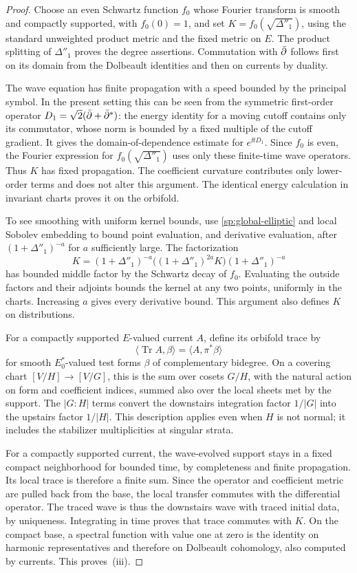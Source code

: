 \begin{proof}
Choose an even Schwartz function $f_0$ whose Fourier transform is smooth
and compactly supported, with $f_0(0)=1$, and set
$K=f_0(\sqrt{\Delta''_1})$, using the standard unweighted product
metric and the fixed metric on $E$.  The product splitting of
$\Delta''_1$ proves the degree assertions.  Commutation with $\bar\partial$
follows first on its domain from the Dolbeault identities and then on
currents by duality.

The wave equation has finite propagation with a speed bounded by the
principal symbol.  In the present setting this can be seen from the
symmetric first-order operator $D_1=\sqrt2(\bar\partial+\bar\partial^*)$:
the energy identity for a moving cutoff contains only its commutator,
whose norm is bounded by a fixed multiple of the cutoff gradient.
It gives the domain-of-dependence estimate for $e^{\ii tD_1}$.
Since $f_0$ is even, the Fourier expression for
$f_0(\sqrt{\Delta''_1})$ uses only these finite-time wave operators.
Thus $K$ has fixed propagation.  The coefficient curvature contributes
only lower-order terms and does not alter this argument.  The identical
energy calculation in invariant charts proves it on the orbifold.

To see smoothing with uniform kernel bounds, use
\eqref{sp:global-elliptic} and local Sobolev embedding to bound point
evaluation, and derivative evaluation, after $(1+\Delta''_1)^{-a}$
for $a$ sufficiently large.  The factorization
\[
 K=(1+\Delta''_1)^{-a}
 \bigl((1+\Delta''_1)^{2a}K\bigr)
 (1+\Delta''_1)^{-a}
\]
has bounded middle factor by the Schwartz decay of $f_0$.  Evaluating
the outside factors and their adjoints bounds the kernel at any two
points, uniformly in the charts.  Increasing $a$ gives every derivative
bound.  This argument also defines $K$ on distributions.

For a compactly supported $E$-valued current $A$, define its orbifold
trace by
\[
 \langle\operatorname{Tr}A,\beta\rangle
 =\langle A,\pi^*\beta\rangle
\]
for smooth $E_0^*$-valued test forms $\beta$ of complementary bidegree.
On a covering chart $[V/H]\to[V/G]$, this is the sum over cosets
$G/H$, with the natural action on form and coefficient indices, summed
also over the local sheets met by the support.  The $|G:H|$ terms
convert the downstairs integration factor $1/|G|$ into the upstairs
factor $1/|H|$.  This description applies even when $H$ is not normal;
it includes the stabilizer multiplicities at singular strata.

For a compactly supported current, the wave-evolved support stays in a
fixed compact neighborhood for bounded time, by completeness and finite
propagation.  Its local trace is therefore a finite sum.  Since the
operator and coefficient metric are pulled back from the base, the
local transfer commutes with the differential operator.  The traced
wave is thus the downstairs wave with traced initial data, by
uniqueness.  Integrating in time proves that trace commutes with $K$.
On the compact base, a spectral function with value one at zero is the
identity on harmonic representatives and therefore on Dolbeault
cohomology, also computed by currents.  This proves~\textup{(iii)}.


\end{proof}
